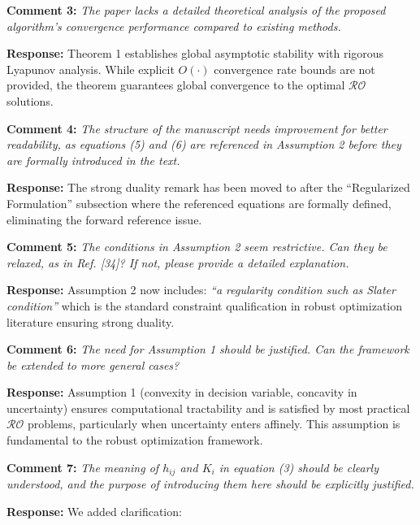 \documentclass[journal,twoside,web]{ieeecolor}
\begin{document}
\vspace{0.5em}
\noindent\textbf{Comment 3:} \textit{The paper lacks a detailed theoretical analysis of the proposed algorithm's convergence performance compared to existing methods.}

\noindent\textbf{Response:} Theorem 1 establishes global asymptotic stability with rigorous Lyapunov analysis. While explicit $O(\cdot)$ convergence rate bounds are not provided, the theorem guarantees global convergence to the optimal $\mathcal{RO}$ solutions.

\vspace{0.5em}
\noindent\textbf{Comment 4:} \textit{The structure of the manuscript needs improvement for better readability, as equations (5) and (6) are referenced in Assumption 2 before they are formally introduced in the text.}

\noindent\textbf{Response:} The strong duality remark has been moved to after the ``Regularized Formulation'' subsection where the referenced equations are formally defined, eliminating the forward reference issue.

\vspace{0.5em}
\noindent\textbf{Comment 5:} \textit{The conditions in Assumption 2 seem restrictive. Can they be relaxed, as in Ref. [34]? If not, please provide a detailed explanation.}

\noindent\textbf{Response:} Assumption 2 now includes: {\color{revisionblue}\textit{``a regularity condition such as Slater condition''}} which is the standard constraint qualification in robust optimization literature ensuring strong duality.

\vspace{0.5em}
\noindent\textbf{Comment 6:} \textit{The need for Assumption 1 should be justified. Can the framework be extended to more general cases?}

\noindent\textbf{Response:} Assumption 1 (convexity in decision variable, concavity in uncertainty) ensures computational tractability and is satisfied by most practical $\mathcal{RO}$ problems, particularly when uncertainty enters affinely. This assumption is fundamental to the robust optimization framework.

\vspace{0.5em}
\noindent\textbf{Comment 7:} \textit{The meaning of $h_{ij}$ and $K_i$ in equation (3) should be clearly understood, and the purpose of introducing them here should be explicitly justified.}

\noindent\textbf{Response:} We added clarification:
\end{document}
